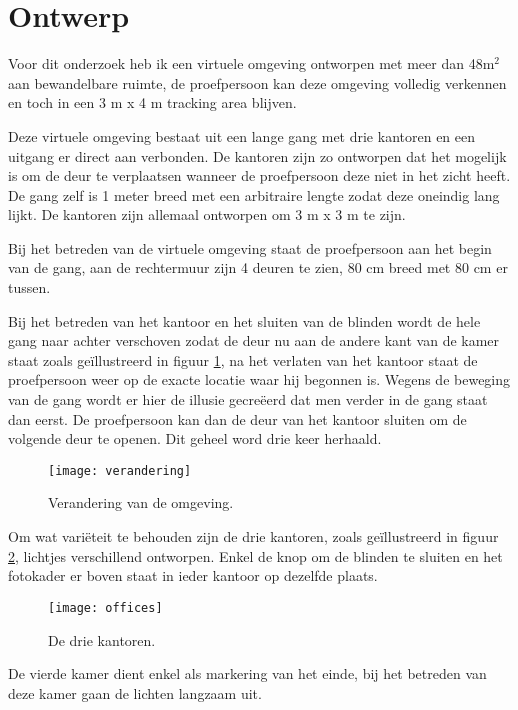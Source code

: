 \section{Ontwerp}
Voor dit onderzoek heb ik een virtuele omgeving ontworpen met meer dan 48m$^2$
aan bewandelbare ruimte, de proefpersoon kan deze omgeving volledig verkennen en
toch in een 3 m x 4 m tracking area blijven.

Deze virtuele omgeving bestaat uit een lange gang met drie kantoren en een 
uitgang er direct aan verbonden. De kantoren zijn zo ontworpen dat het mogelijk 
is om de deur te verplaatsen wanneer de proefpersoon deze niet in het zicht
heeft. De gang zelf is 1 meter breed met een arbitraire lengte zodat deze
oneindig lang lijkt. De kantoren zijn allemaal ontworpen om 3 m x 3 m te zijn.

Bij het betreden van de virtuele omgeving staat de proefpersoon aan het begin van
de gang, aan de rechtermuur zijn 4 deuren te zien, 80 cm breed met 80 cm er
tussen.

Bij het betreden van het kantoor en het sluiten van de blinden wordt de hele 
gang naar achter verschoven zodat de deur nu aan de andere kant van de kamer 
staat zoals ge\"illustreerd in figuur \ref{fig:verandering}, na het verlaten van 
het kantoor staat de proefpersoon weer op de exacte locatie waar hij begonnen is.
Wegens de beweging van de gang wordt er hier de illusie gecre\"eerd dat men
verder in de gang staat dan eerst. De proefpersoon kan dan de deur van het 
kantoor sluiten om de volgende deur te openen. Dit geheel word drie keer 
herhaald.

\begin{figure}[p]
    \centering
    \texttt{[image: verandering]}
    \caption{Verandering van de omgeving.}
    \label{fig:verandering}
\end{figure}

Om wat vari\"eteit te behouden zijn de drie kantoren, zoals ge\"illustreerd 
in figuur \ref{fig:kantoren}, lichtjes verschillend ontworpen. Enkel de knop om 
de blinden te sluiten en het fotokader er boven staat in ieder kantoor op 
dezelfde plaats.

\begin{figure}[p]
    \centering
    \texttt{[image: offices]}
    \caption{De drie kantoren.}
    \label{fig:kantoren}
\end{figure}

De vierde kamer dient enkel als markering van het einde, bij het betreden van
deze kamer gaan de lichten langzaam uit.

